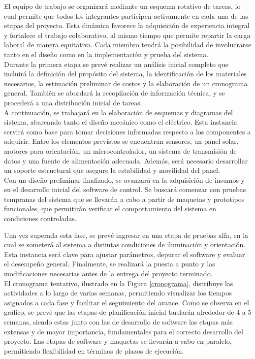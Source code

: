 \documentclass[a4paper,12pt]{article}
\begin{document}
El equipo de trabajo se organizará mediante un esquema rotativo de tareas, lo cual permite que todos los integrantes participen activamente en cada una de las etapas del proyecto. Esta dinámica favorece la adquisición de experiencia integral y fortalece el trabajo colaborativo, al mismo tiempo que permite repartir la carga laboral de manera equitativa. Cada miembro tendrá la posibilidad de involucrarse tanto en el diseño como en la implementación y prueba del sistema.\\

Durante la primera etapa se prevé realizar un análisis inicial completo que incluirá la definición del propósito del sistema, la identificación de los materiales necesarios, la estimación preliminar de costos y la elaboración de un cronograma general. También se abordará la recopilación de información técnica, y se procederá a una distribución inicial de tareas.\\

A continuación, se trabajará en la elaboración de esquemas y diagramas del sistema, abarcando tanto el diseño mecánico como el eléctrico. Esta instancia servirá como base para tomar decisiones informadas respecto a los componentes a adquirir. Entre los elementos previstos se encuentran sensores, un panel solar, motores para orientación, un microcontrolador, un sistema de transmisión de datos y una fuente de alimentación adecuada. Además, será necesario desarrollar un soporte estructural que asegure la estabilidad y movilidad del panel.\\

Con un diseño preliminar finalizado, se avanzará en la adquisición de insumos y en el desarrollo inicial del software de control. Se buscará comenzar con pruebas tempranas del sistema que se llevarán a cabo a partir de maquetas y prototipos funcionales, que permitirán verificar el comportamiento del sistema en condiciones controladas.

Una vez superada esta fase, se prevé ingresar en una etapa de pruebas alfa, en la cual se someterá al sistema a distintas condiciones de iluminación y orientación. Esta instancia será clave para ajustar parámetros, depurar el software y evaluar el desempeño general. Finalmente, se realizará la puesta a punto y las modificaciones necesarias antes de la entrega del proyecto terminado.\\

El cronograma tentativo, ilustrado en la Figura \ref{cronograma}, distribuye las actividades a lo largo de varias semanas, permitiendo visualizar los tiempos asignados a cada fase y facilitar el seguimiento del avance.
Como se observa en el gráfico, se prevé que las etapas de planificación inicial tardarán alrededor de 4 a 5 semanas, siendo estas junto con las de desarrollo de software las etapas más extensas y de mayor importancia, fundamentales para el correcto desarrollo del proyecto. Las etapas de software y maquetas se llevarán a cabo en paralelo, permitiendo flexibilidad en términos de plazos de ejecución.\\
\end{document}
